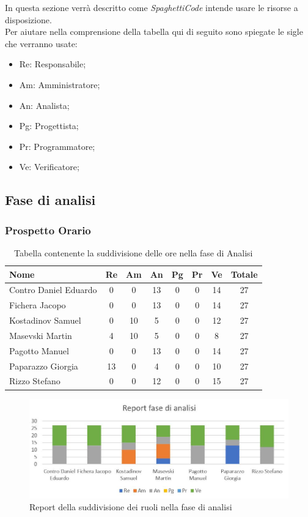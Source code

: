 \documentclass[../piano_di_progetto.tex]{subfiles}
\begin{document}
In questa sezione verrà descritto come \emph{SpaghettiCode} intende usare le risorse a disposizione. \\
Per aiutare nella comprensione della tabella qui di seguito sono spiegate le sigle che verranno usate:
\begin{itemize}
\item Re: Responsabile;
\item Am: Amministratore;
\item An: Analista;
\item Pg: Progettista;
\item Pr: Programmatore;
\item Ve: Verificatore;
\end{itemize}


\subsection{ Fase di analisi}%
\label{sub:fase_analisi}
\subsubsection{Prospetto Orario}


\begin{table}[!ht]
	\centering
	\begin{tabular}{|l|c|c|c|c|c|c|c|}
	\hline
	\rowcolor{lightgray}
	\textbf{Nome} & \textbf{Re} & \textbf{Am} & \textbf{An} & \textbf{Pg}  & \textbf{Pr}   & \textbf{Ve} & \textbf{Totale}\\
	\hline
		Contro Daniel Eduardo & 0 & 0 & 13 & 0 & 0 & 14 & 27 \\
	\hline
		Fichera Jacopo & 0 & 0 & 13 & 0 & 0 & 14 & 27 \\
	\hline
		Kostadinov Samuel & 0 & 10 & 5 & 0 & 0 & 12 & 27 \\			
	\hline
		Masevski Martin & 4 & 10 & 5 & 0 & 0 & 8 & 27 \\
	\hline
		Pagotto Manuel & 0 & 0 & 13 & 0 & 0 & 14 & 27 \\			
	\hline
		Paparazzo Giorgia & 13 & 0 & 4 & 0 & 0 & 10 & 27 \\
	\hline
		Rizzo Stefano & 0 & 0 & 12 & 0 & 0 & 15 & 27 \\
	\hline	
	\end{tabular}
	\caption{Tabella contenente la suddivisione delle ore nella fase di Analisi}
\end{table}

\begin{figure}[H]
\centering
\includegraphics[width=12cm]{img/report_analisi}
\caption{Report della suddivisione dei ruoli nella fase di analisi}
\end{figure}
\end{document}
